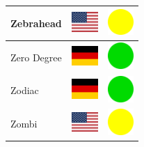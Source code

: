 \documentclass[12pt, a4paper, twoside]{report}
\begin{document}
\begin{center}
\begin{longtable}{|p{5cm}|p{2cm}|p{2cm}|}
 Zebrahead                                                  & \includegraphics[width=1cm]{4x3/us} &   \includegraphics[width=1cm]{likes/m} \\ \hline
 Zero Degree                                                & \includegraphics[width=1cm]{4x3/de} &   \includegraphics[width=1cm]{likes/y} \\ \hline
 Zodiac                                                     & \includegraphics[width=1cm]{4x3/de} &   \includegraphics[width=1cm]{likes/y} \\ \hline
 Zombi                                                      & \includegraphics[width=1cm]{4x3/us} &   \includegraphics[width=1cm]{likes/m} \\ \hline
		\end{longtable}
	\end{center}
\end{document}
